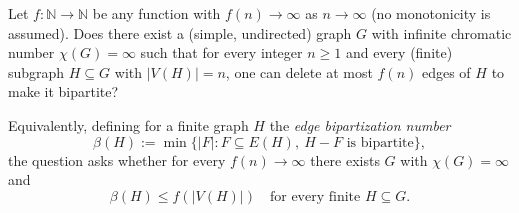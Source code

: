 Let $f:\mathbb N\to\mathbb N$ be any function with $f(n)\to\infty$ as $n\to\infty$ (no monotonicity is assumed). Does there exist a (simple, undirected) graph $G$ with infinite chromatic number $\chi(G)=\infty$ such that for every integer $n\ge 1$ and every (finite) subgraph $H\subseteq G$ with $\lvert V(H)\rvert=n$, one can delete at most $f(n)$ edges of $H$ to make it bipartite?

Equivalently, defining for a finite graph $H$ the \emph{edge bipartization number}
\[
\beta(H):=\min\{\lvert F\rvert: F\subseteq E(H),\ H-F\text{ is bipartite}\},
\]
the question asks whether for every $f(n)\to\infty$ there exists $G$ with $\chi(G)=\infty$ and
\[
\beta(H)\le f(\lvert V(H)\rvert)\quad\text{for every finite }H\subseteq G.
\]
